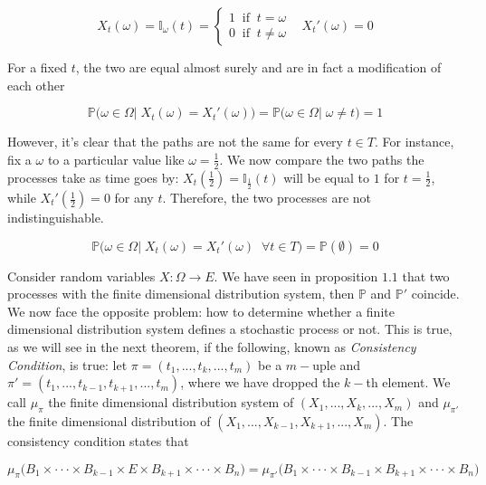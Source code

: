 \begin{equation*}
    X_t(\omega) = \mathbb{I}_{\omega}(t) = 
    \begin{cases}
        1 \;\; \text{if} \;\; t = \omega \\
        0 \;\; \text{if} \;\; t \neq \omega
    \end{cases}
    \;\;\;
    X_t'(\omega) = 0
\end{equation*}

For a fixed $t$, the two are equal almost surely and are in fact a modification of each other

\begin{equation*}
    \mathbb{P}\big( \omega \in \Omega \big\vert \; X_t(\omega) = X_t'(\omega) \big) = \mathbb{P}\big(\omega \in \Omega \big\vert \; \omega \neq t \big) = 1
\end{equation*}

However, it's clear that the paths are not the same for every $t \in T$. For instance, fix a $\omega$ to a particular value like $\omega = \frac{1}{2}$. We now compare the two paths the processes take as time goes by: $X_t(\frac{1}{2}) = \mathbb{I}_{\frac{1}{2}}(t)$ will be equal to $1$ for $t = \frac{1}{2}$, while $X_t'(\frac{1}{2}) = 0$ for any $t$. Therefore, the two processes are not indistinguishable. 

\begin{equation*}
    \mathbb{P}\big( \omega \in \Omega \big\vert\; X_t(\omega) = X_t'(\omega) \;\; \forall t \in T \big) = \mathbb{P}(\emptyset) = 0
\end{equation*}

Consider random variables $X : \Omega \to E$. We have seen in proposition $1.1$ that two processes with the finite dimensional distribution system, then $\mathbb{P}$ and $\mathbb{P}'$ coincide. We now face the opposite problem: how to determine whether a finite dimensional distribution system defines a stochastic process or not. This is true, as we will see in the next theorem, if the following, known as \textit{Consistency Condition}, is true: let $\pi = (t_1,...,t_{k},...,t_m)$ be a $m-$uple and $\pi' = (t_1,...,t_{k-1},t_{k+1},...,t_m)$, where we have dropped the $k-$th element. We call $\mu_{\pi}$ the finite dimensional distribution system of $(X_1,...,X_k,...,X_m)$ and $\mu_{\pi'}$ the finite dimensional distribution of $(X_1,...,X_{k-1},X_{k+1},...,X_m)$. The consistency condition states that

\begin{equation}
    \mu_{\pi}\big(B_1 \times \cdot \cdot \cdot \times B_{k-1} \times E \times B_{k+1} \times \cdot\cdot\cdot \times B_n\big) = \mu_{\pi'}\big(B_1 \times \cdot\cdot\cdot \times B_{k-1} \times B_{k+1} \times \cdot\cdot\cdot \times B_n)
\end{equation}

